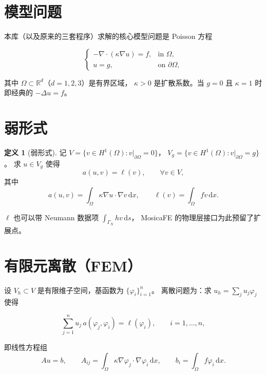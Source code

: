 \documentclass[UTF8,11pt,oneside]{ctexbook}
\theoremstyle{definition}
\newtheorem{definition}{定义}[chapter]
\theoremstyle{plain}
\newcommand{\mosica}{\textsf{MosicaFE}}
\newcommand{\dif}{\,\mathrm{d}}
\begin{document}
\section{模型问题}

本库（以及原来的三套程序）求解的核心模型问题是 Poisson 方程

\begin{equation}
\begin{cases}
-\nabla\cdot(\kappa\nabla u) = f, & \text{in } \Omega,\\[2pt]
u = g, & \text{on } \partial\Omega,
\end{cases}
\label{eq:poisson}
\end{equation}

其中 $\Omega\subset\mathbb{R}^d$（$d=1,2,3$）是有界区域，
$\kappa>0$ 是扩散系数。当 $g=0$ 且 $\kappa=1$ 时即经典的
$-\Delta u=f$。

\section{弱形式}

\begin{definition}[弱形式]
记 $V=\{v\in H^1(\Omega): v|_{\partial\Omega}=0\}$，
$V_g=\{v\in H^1(\Omega): v|_{\partial\Omega}=g\}$。
求 $u\in V_g$ 使得
\begin{equation}
a(u,v)=\ell(v),\qquad \forall v\in V,
\label{eq:weak}
\end{equation}
其中
\begin{equation}
a(u,v)=\int_\Omega \kappa\nabla u\cdot\nabla v\dif x,\qquad
\ell(v)=\int_\Omega f v\dif x .
\label{eq:bilinear}
\end{equation}
\end{definition}

$\ell$ 也可以带 Neumann 数据项 $\int_{\Gamma_N} h v\dif s$，
\mosica{} 的物理层接口为此预留了扩展点。

\section{有限元离散（FEM）}

设 $V_h\subset V$ 是有限维子空间，基函数为 $\{\varphi_i\}_{i=1}^n$。
离散问题为：求 $u_h=\sum_j u_j\varphi_j$ 使得

\begin{equation}
\sum_{j=1}^n u_j\,a(\varphi_j,\varphi_i)=\ell(\varphi_i),\qquad i=1,\dots,n,
\label{eq:fem-system}
\end{equation}

即线性方程组
\begin{equation}
A u = b,\qquad
A_{ij}=\int_\Omega\kappa\nabla\varphi_j\cdot\nabla\varphi_i\dif x,\qquad
b_i=\int_\Omega f\varphi_i\dif x .
\label{eq:Au}
\end{equation}
\end{document}

